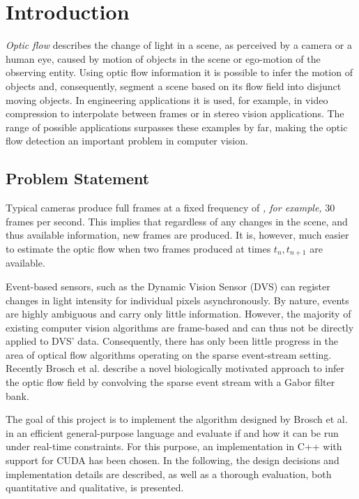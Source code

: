 \documentclass[a4paper,twoside, openright,12pt]{report}
\begin{document}
\chapter{Introduction}

\textit{Optic flow} describes the change of light in a scene, as perceived by a camera or a human eye, caused by motion of objects in the scene or ego-motion of the observing entity.
Using optic flow information it is possible to infer the motion of objects and, consequently, segment a scene based on its flow field into disjunct moving objects.
In engineering applications it is used, for example, in video compression to interpolate between frames or in stereo vision applications.
The range of possible applications surpasses these examples by far, making the optic flow detection an important problem in computer vision.

\section{Problem Statement}

Typical cameras produce full frames at a fixed frequency of \emph{, for example,} 30 frames per second.
This implies that regardless of any changes in the scene, and thus available information, new frames are produced.
It is, however, much easier to estimate the optic flow when two frames produced at times $t_n,t_{n+1}$ are available.

Event-based sensors, such as the Dynamic Vision Sensor (DVS) \cite{Delbruck} can register changes in light intensity for individual pixels asynchronously. By nature, events are highly ambiguous and carry only little information. However, the majority of existing computer vision algorithms are frame-based and can thus not be directly applied to DVS' data. Consequently, there has only been little progress in the area of optical flow algorithms operating on the sparse event-stream setting.
Recently Brosch et al. \cite{Brosch2015} describe a novel biologically motivated approach to infer the optic flow field by convolving the sparse event stream with a Gabor filter bank.

The goal of this project is to implement the algorithm designed by Brosch et al. in an efficient general-purpose language and evaluate if and how it can be run under real-time constraints.
For this purpose, an implementation in C++ with support for CUDA has been chosen.
In the following, the design decisions and implementation details are described, as well as a thorough evaluation, both quantitative and qualitative, is presented.
\end{document}
